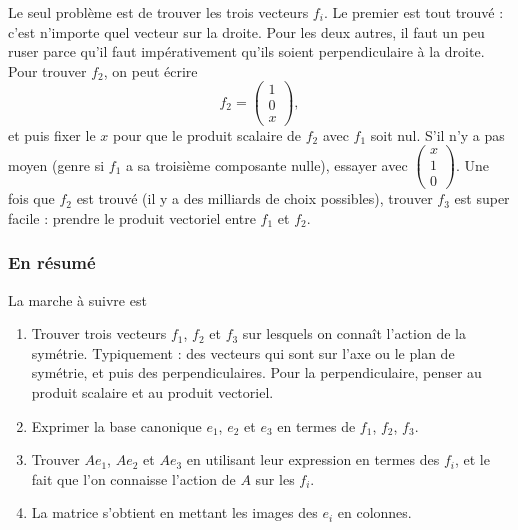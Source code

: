 Le seul problème est de trouver les trois vecteurs $f_i$. Le premier est tout trouvé : c'est n'importe quel vecteur sur la droite. Pour les deux autres, il faut un peu ruser parce qu'il faut impérativement qu'ils soient perpendiculaire à la droite. Pour trouver $f_2$, on peut écrire
\begin{equation}
	f_2=\begin{pmatrix}
		1	\\
		0	\\
		x
	\end{pmatrix},
\end{equation}
et puis fixer le $x$ pour que le produit scalaire de $f_2$ avec $f_1$ soit nul. S'il n'y a pas moyen (genre si $f_1$ a sa troisième composante nulle), essayer avec $\begin{pmatrix}
	x	\\
	1	\\
	0
\end{pmatrix}$. Une fois que $f_2$ est trouvé (il y a des milliards de choix possibles), trouver $f_3$ est super facile : prendre le produit vectoriel entre $f_1$ et $f_2$.

\subsubsection{En résumé}
La marche à suivre est

\begin{enumerate}

	\item
		Trouver trois vecteurs $f_1$, $f_2$ et $f_3$ sur lesquels on connaît l'action de la symétrie. Typiquement : des vecteurs qui sont sur l'axe ou le plan de symétrie, et puis des perpendiculaires. Pour la perpendiculaire, penser au produit scalaire et au produit vectoriel.

	\item
		Exprimer la base canonique $e_1$, $e_2$ et $e_3$ en termes de $f_1$, $f_2$, $f_3$.

	\item
		Trouver $Ae_1$, $Ae_2$ et $Ae_3$ en utilisant leur expression en termes des $f_i$, et le fait que l'on connaisse l'action de $A$ sur les $f_i$.

	\item
		La matrice s'obtient en mettant les images des $e_i$ en colonnes.
\end{enumerate}


